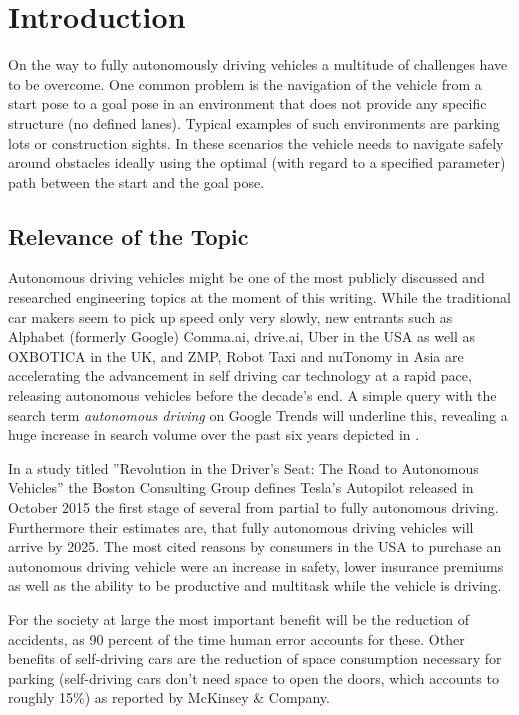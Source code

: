 \chapter{Introduction}
On the way to fully autonomously driving vehicles a multitude of challenges have to be overcome. One common problem is the navigation of the vehicle from a start pose to a goal pose in an environment that does not provide any specific structure (no defined lanes). Typical examples of such environments are parking lots or construction sights. In these scenarios the vehicle needs to navigate safely around obstacles ideally using the optimal (with regard to a specified parameter) path between the start and the goal pose.

\section{Relevance of the Topic}
Autonomous driving vehicles might be one of the most publicly discussed and researched engineering topics at the moment of this writing. While the traditional car makers seem to pick up speed only very slowly, new entrants such as Alphabet (formerly Google) Comma.ai, drive.ai, Uber in the USA as well as OXBOTICA in the UK, and ZMP, Robot Taxi and nuTonomy in Asia are accelerating the advancement in self driving car technology at a rapid pace, releasing autonomous vehicles before the decade's end. A simple query with the search term \emph{autonomous driving} on Google Trends will underline this, revealing a huge increase in search volume over the past six years depicted in .

In a study titled ''Revolution in the Driver's Seat: The Road to Autonomous Vehicles'' the Boston Consulting Group defines Tesla's Autopilot released in October 2015 the first stage of several from partial to fully autonomous driving. Furthermore their estimates are, that fully autonomous driving vehicles will arrive by 2025. The most cited reasons by consumers in the USA to purchase an autonomous driving vehicle were an increase in safety, lower insurance premiums as well as the ability to be productive and multitask while the vehicle is driving. \cite{Mosquet.2015} 

For the society at large the most important benefit will be the reduction of accidents, as 90 percent of the time human error accounts for these. Other benefits of self-driving cars are the reduction of space consumption necessary for parking (self-driving cars don't need space to open the doors, which accounts to roughly 15\%) as reported by McKinsey \& Company. \cite{Bertoncello.2015}

